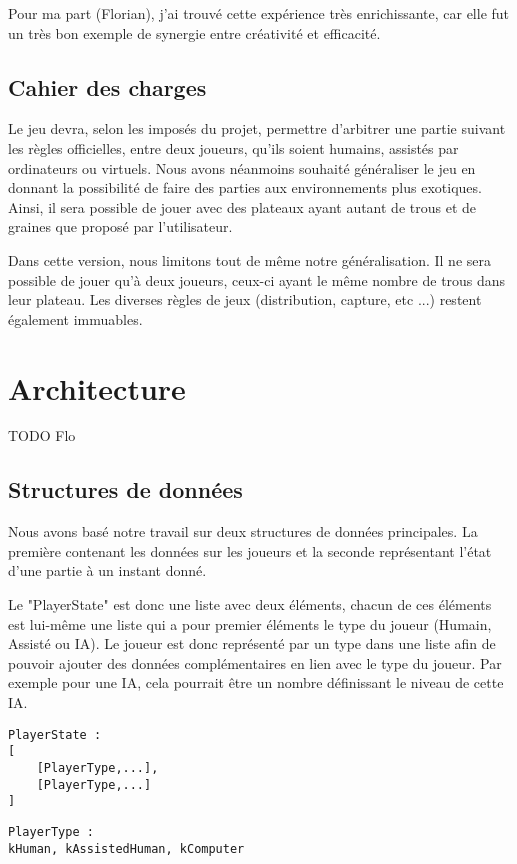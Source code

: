 \documentclass[]{article}
\begin{document}
Pour ma part (Florian), j'ai trouvé cette expérience très enrichissante, car elle fut un très bon exemple de synergie entre créativité et efficacité.

\subsection{Cahier des charges}

Le jeu devra, selon les imposés du projet, permettre d'arbitrer une partie suivant les règles officielles, entre deux joueurs, qu'ils soient humains, assistés par ordinateurs ou virtuels. Nous avons néanmoins souhaité généraliser le jeu en donnant la possibilité de faire des parties aux environnements plus exotiques. Ainsi, il sera possible de jouer avec des plateaux ayant autant de trous et de graines que proposé par l'utilisateur. 

Dans cette version, nous limitons tout de même notre généralisation. Il ne sera possible de jouer qu'à deux joueurs, ceux-ci ayant le même nombre de trous dans leur plateau. Les diverses règles de jeux (distribution, capture, etc ...) restent également immuables.

\section{Architecture}

TODO Flo
\subsection{Structures de données}

	Nous avons basé notre travail sur deux structures de données principales. La première contenant les données sur les joueurs et la seconde représentant l'état d'une partie à un instant donné.

Le "PlayerState" est donc une liste avec deux éléments, chacun de ces éléments est lui-même une liste qui a pour premier éléments le type du joueur (Humain, Assisté ou IA).
Le joueur est donc représenté par un type dans une liste afin de pouvoir ajouter des données complémentaires en lien avec le type du joueur. Par exemple pour une IA, cela pourrait être un nombre définissant le niveau de cette IA.

\begin{verbatim}
PlayerState : 
[
	[PlayerType,...],
	[PlayerType,...]
]
\end{verbatim}

\begin{verbatim}
PlayerType :
kHuman, kAssistedHuman, kComputer
\end{verbatim}
\end{document}
